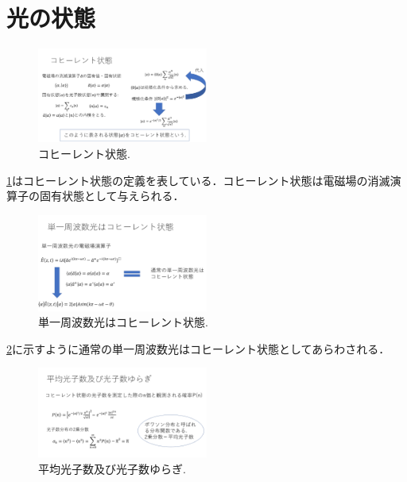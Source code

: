 \documentclass[a4j,twocolumn]{jarticle}
\def \figref #1{\figurename\ref{#1}}
\begin{document}
\section{光の状態
}
\begin{figure}[htbp]
        \centering   
        \includegraphics[width=0.5\textwidth]{img/zemi9.png}
        \caption[sample image (png)]{コヒーレント状態.}
        \label{Fig:1_5_1}
    \end{figure}
    
    \figref{Fig:1_5_1}はコヒーレント状態の定義を表している．コヒーレント状態は電磁場の消滅演算子の固有状態として与えられる．
    
\begin{figure}[htbp]
        \centering   
        \includegraphics[width=0.5\textwidth]{img/zemi10.png}
        \caption[sample image (png)]{単一周波数光はコヒーレント状態.}
        \label{Fig:1_5_2}
    \end{figure}
    
    \figref{Fig:1_5_2}に示すように通常の単一周波数光はコヒーレント状態としてあらわされる．

\begin{figure}[htbp]
        \centering   
        \includegraphics[width=0.5\textwidth]{img/zemi11.png}
        \caption[sample image (png)]{平均光子数及び光子数ゆらぎ.}
        \label{Fig:1_5_3}
    \end{figure}
    
\end{document}
